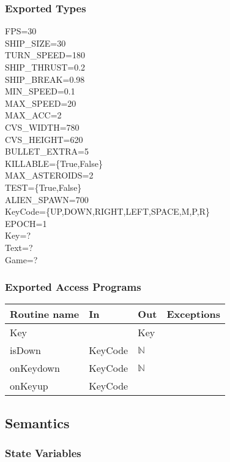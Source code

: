 \documentclass[12pt]{article}
\begin{document}
\subsubsection*{Exported Types}

FPS=30\\
SHIP\_SIZE=30\\
TURN\_SPEED=180\\
SHIP\_THRUST=0.2\\
SHIP\_BREAK=0.98\\
MIN\_SPEED=0.1\\
MAX\_SPEED=20\\
MAX\_ACC=2\\
CVS\_WIDTH=780\\
CVS\_HEIGHT=620\\
BULLET\_EXTRA=5\\
KILLABLE=\{True,False\}\\
MAX\_ASTEROIDS=2\\
TEST=\{True,False\}\\
ALIEN\_SPAWN=700\\
KeyCode=\{UP,DOWN,RIGHT,LEFT,SPACE,M,P,R\}\\
EPOCH=1\\
Key=?\\
Text=?\\
Game=?\\

\subsubsection*{Exported Access Programs}

\begin{tabular}{| l | l | l | l |} %
\hline
\textbf{Routine name} & \textbf{In} & \textbf{Out} & \textbf{Exceptions}\\
\hline
Key &  & Key & ~\\
\hline
isDown & KeyCode & $\mathbb{N}$ & ~\\
\hline
onKeydown & KeyCode & $\mathbb{N}$ & ~\\
\hline
onKeyup & KeyCode &  & ~\\
\hline
\end{tabular}

\subsection*{Semantics}

\subsubsection*{State Variables}
\end{document}
